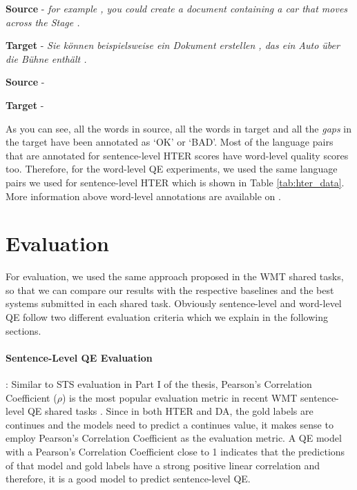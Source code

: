 \noindent \textbf{Source} - \textit{for example , you could create a document containing a car that moves across the Stage .}

\noindent \textbf{Target} - \textit{Sie können beispielsweise ein Dokument erstellen , das ein Auto über die Bühne enthält .}


\noindent \textbf{Source} - \textit{  \hlgreen{,}              }

\noindent \textbf{Target} - \textit{             \hlgreen{,}                 }

As you can see, all the words in source, all the words in target and all the \textit{gaps} in the target have been annotated as `OK' or `BAD'.  Most of the language pairs that are annotated for sentence-level HTER scores have word-level quality scores too. Therefore, for the word-level QE experiments, we used the same language pairs we used for sentence-level HTER which is shown in Table \ref{tab:hter_data}. More information above word-level annotations are available on \cite{specia-etal-2018-findings,fonseca-etal-2019-findings,specia-etal-2020-findings-wmt}.


\section{Evaluation}
\label{sec:qe_evaluation}
For evaluation, we used the same approach proposed in the WMT shared tasks, so that we can compare our results with the respective baselines and the best systems submitted in each shared task. Obviously sentence-level and word-level QE follow two different evaluation criteria which we explain in the following sections. 

\paragraph{Sentence-Level QE Evaluation} : Similar to STS evaluation in Part I of the thesis, Pearson's Correlation Coefficient ($\rho$) is the most popular evaluation metric in recent WMT sentence-level QE shared tasks \cite{specia-etal-2018-findings,fonseca-etal-2019-findings,specia-etal-2020-findings-wmt}. Since in both HTER and DA, the gold labels are continues and the models need to predict a continues value, it makes sense to employ Pearson's Correlation Coefficient as the evaluation metric. A QE model with a Pearson's Correlation Coefficient close to 1 indicates that the predictions of that model and gold labels have a strong positive linear correlation and therefore, it is a good model to predict sentence-level QE. 


